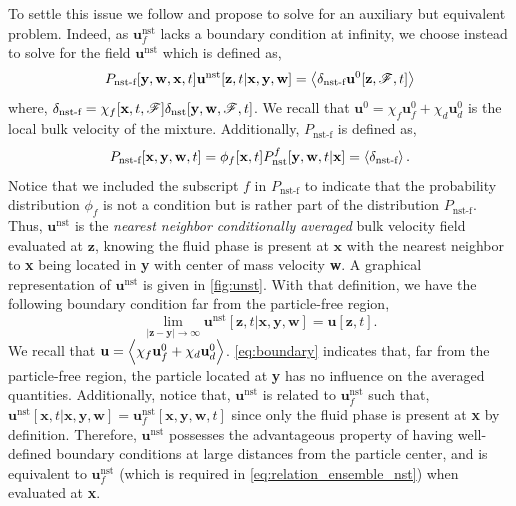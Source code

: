 To settle this issue we follow \citet[Appendix B]{zhang2021ensemble} and propose to solve for an auxiliary but equivalent problem.
Indeed, as $\textbf{u}_f^\text{nst}$ lacks a boundary condition at infinity, we choose instead to solve for the field $\textbf{u}^\text{nst}$ which is defined as,  
\begin{equation*}
    P_\text{nst-f}[\textbf{y},\textbf{w},\textbf{x},t]\textbf{u}^\text{nst}[\textbf{z},t|\textbf{x},\textbf{y},\textbf{w}]
    = \avg{\delta_\text{nst-f}  \textbf{u}^0[\textbf{z},\FF,t]}
    \label{eq:def_u_z}
\end{equation*}
where, $\delta_\text{nst-f} = \chi_f[\textbf{x},t,\mathscr{F}]\delta_\text{nst}[\textbf{y},\textbf{w}, \mathscr{F},t]$. 
We recall that $\textbf{u}^0 = \chi_f\textbf{u}_f^0 + \chi_d \textbf{u}_d^0$ is the local bulk velocity of the mixture. 
Additionally, $P_\text{nst-f}$ is defined as,
\begin{equation}
    P_\text{nst-f}[\textbf{x},\textbf{y},\textbf{w},t] = \phi_f[\textbf{x},t]P_\text{nst}^f[\textbf{y},\textbf{w},t|\textbf{x}] = \left<\delta_\text{nst-f}\right>. 
\end{equation}
Notice that we included the subscript $f$ in $P_\text{nst-f}$ to indicate that the probability distribution $\phi_f$ is not a condition but is rather part of the distribution $P_\text{nst-f}$.
Thus, $\textbf{u}^\text{nst}$ is the \textit{nearest neighbor conditionally averaged} bulk velocity field evaluated at $\textbf{z}$, knowing the fluid phase is present at $\textbf{x}$ with the nearest neighbor to \textbf{x} being located in \textbf{y} with center of mass velocity \textbf{w}. 
A graphical representation of $\textbf{u}^\text{nst}$ is given in \ref{fig:unst}.
With that definition, we have the following boundary condition far from the particle-free region, 
\begin{equation}
    \lim_{|\textbf{z} - \textbf{y}|\to \infty}
    \textbf{u}^\text{nst}[\textbf{z},t|\textbf{x},\textbf{y},\textbf{w}]
    = \textbf{u}[\textbf{z},t]. 
    \label{eq:boundary}
\end{equation}
We recall that $\textbf{u} = \left<\chi_f\textbf{u}_f^0 + \chi_d \textbf{u}_d^0\right>$. 
\ref{eq:boundary} indicates that, far from the particle-free region, the particle located at \textbf{y} has no influence on the averaged quantities.
Additionally, notice that, $\textbf{u}^\text{nst}$ is related to $\textbf{u}_f^\text{nst}$ such that, $\textbf{u}^\text{nst}[\textbf{x},t|\textbf{x},\textbf{y},\textbf{w}] = \textbf{u}_f^\text{nst}[\textbf{x},\textbf{y},\textbf{w},t]$ since only the fluid phase is present at \textbf{x} by definition. 
Therefore, $\textbf{u}^\text{nst}$ possesses the advantageous property of having well-defined boundary conditions at large distances from the particle center, and is equivalent to $\textbf{u}_f^\text{nst}$ (which is required in \ref{eq:relation_ensemble_nst}) when evaluated at \textbf{x}. 


